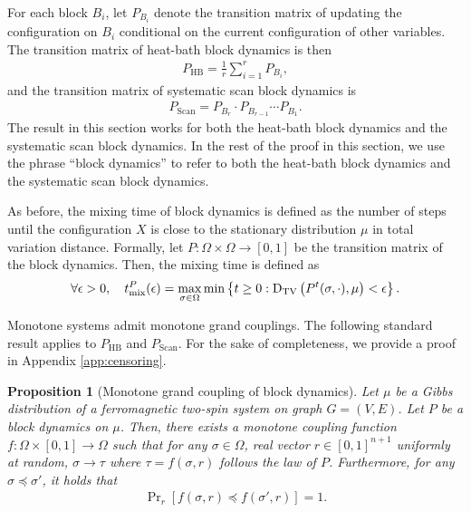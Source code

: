 \documentclass[11pt]{amsart}
\newcommand{\htodo}[1]{\todo[color=green!30]{Heng: #1}}
\renewcommand{\Pr}{\mathop{\mathrm{Pr}}\nolimits}
\def\-#1{\mathrm{#1}}
\newcommand{\abs}[1]{\ensuremath{\left\vert#1\right\vert}}
\newcommand{\DTV}[2]{\-D_{\mathrm{TV}}\left({#1},{#2}\right)}
\newtheorem{proposition}[theorem]{Proposition}
\theoremstyle{definition}
\theoremstyle{remark}
\begin{document}
For each block $B_i$, let $P_{B_i}$ denote the transition matrix of updating the configuration on $B_i$ conditional on the current configuration of other variables. The transition matrix of heat-bath block dynamics is then 
\begin{align*}
  P_{\text{HB}} = \frac{1}{r}\sum_{i=1}^r P_{B_i},
\end{align*}
and the transition matrix of systematic scan block dynamics is 
\begin{align*}
  P_{\text{Scan}} = P_{B_r} \cdot P_{B_{r-1}} \cdots P_{B_1}.
\end{align*}
The result in this section works for both the heat-bath block dynamics and the systematic scan block dynamics.
In the rest of the proof in this section, we use the phrase ``block dynamics'' to refer to both the heat-bath block dynamics and the systematic scan block dynamics.


As before, the mixing time of block dynamics is defined as the number of steps until the configuration $X$ is close to the stationary distribution $\mu$ in total variation distance. Formally, let $P:\Omega \times \Omega \to [0,1]$ be the transition matrix of the block dynamics. Then, the mixing time is defined as
\begin{align*}
\forall \epsilon > 0, \quad t_{\textnormal{mix}}^{P}(\epsilon) = \max_{\sigma \in \Omega}\min\left\{t \geq 0: \DTV{P^t(\sigma,\cdot)}{\mu} < \epsilon\right\}.
\end{align*}

Monotone systems admit monotone grand couplings.
The following standard result applies to $P_{\text{HB}}$ and $P_{\text{Scan}}$. For the sake of completeness, we provide a proof in Appendix \ref{app:censoring}.
\begin{proposition}[Monotone grand coupling of block dynamics]\label{prop:monotone-coupling}
Let $\mu$ be a Gibbs distribution of a ferromagnetic two-spin system on graph $G=(V,E)$. Let $P$ be a block dynamics on $\mu$. Then, there exists a monotone coupling function $f: \Omega \times [0,1] \to \Omega$ such that for any $\sigma \in \Omega$, real vector $r \in [0,1]^{n+1}$ uniformly at random, $\sigma \to \tau$ where $\tau = f(\sigma,r)$ follows the law of $P$. Furthermore, for any $\sigma \preceq \sigma'$, it holds that 
\begin{align*}
\Pr_r[f(\sigma,r) \preceq f(\sigma',r)] = 1.
\end{align*}
\end{proposition}
\end{document}
